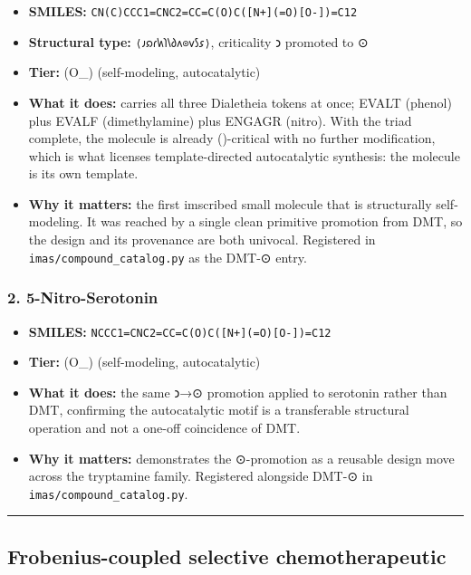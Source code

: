 \documentclass[12pt,a4paper]{article}
\begin{document}
\begin{itemize}
\tightlist
\item
  \textbf{SMILES:}
  \texttt{CN(C)CCC1=CNC2=CC=C(O)C({[}N+{]}(=O){[}O-{]})=C12}
\item
  \textbf{Structural type:} \texttt{⟨𐑨𐑸𐑩𐑿𐑐𐑘𐑔𐑵⊙𐑫𐑕𐑭⟩}, criticality 𐑮
  promoted to ⊙
\item
  \textbf{Tier:} (O\_\infty) (self-modeling, autocatalytic)
\item
  \textbf{What it does:} carries all three Dialetheia tokens at once;
  EVALT (phenol) plus EVALF (dimethylamine) plus ENGAGR (nitro). With
  the triad complete, the molecule is already (\odot)-critical with no
  further modification, which is what licenses template-directed
  autocatalytic synthesis: the molecule is its own template.
\item
  \textbf{Why it matters:} the first imscribed small molecule that is
  structurally self-modeling. It was reached by a single clean primitive
  promotion from DMT, so the design and its provenance are both
  univocal. Registered in \texttt{imas/compound\_catalog.py} as the
  DMT-⊙ entry.
\end{itemize}

\hypertarget{nitro-serotonin}{%
\subsubsection{2. 5-Nitro-Serotonin}\label{nitro-serotonin}}

\begin{itemize}
\tightlist
\item
  \textbf{SMILES:}
  \texttt{NCCC1=CNC2=CC=C(O)C({[}N+{]}(=O){[}O-{]})=C12}
\item
  \textbf{Tier:} (O\_\infty) (self-modeling, autocatalytic)
\item
  \textbf{What it does:} the same 𐑮→⊙ promotion applied to serotonin
  rather than DMT, confirming the autocatalytic motif is a transferable
  structural operation and not a one-off coincidence of DMT.
\item
  \textbf{Why it matters:} demonstrates the ⊙-promotion as a reusable
  design move across the tryptamine family. Registered alongside DMT-⊙
  in \texttt{imas/compound\_catalog.py}.
\end{itemize}

\begin{center}\rule{0.5\linewidth}{0.5pt}\end{center}

\hypertarget{frobenius-coupled-selective-chemotherapeutic}{%
\subsection{Frobenius-coupled selective
chemotherapeutic}\label{frobenius-coupled-selective-chemotherapeutic}}
\end{document}
